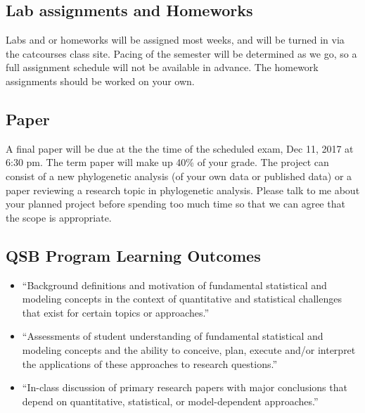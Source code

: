 \documentclass{article}
\begin{document}
\subsection*{Lab assignments and Homeworks}
Labs and or homeworks will be assigned most weeks, and will be turned in via the catcourses class site.
Pacing of the semester will be determined as we go, 
so a full assignment schedule will not be available in advance.
The homework assignments should be worked on your own.

\subsection*{Paper}
A final paper will be due at the the time of the scheduled exam, Dec 11, 2017 at 6:30 pm.
The term paper will make up 40\% of your grade. The project can consist of a new
phylogenetic analysis (of your own data or published data) or a paper reviewing a research topic
in phylogenetic analysis. Please talk to me about your planned project before spending too much
time so that we can agree that the scope is appropriate.


\subsection*{QSB Program Learning Outcomes}
\begin{itemize}
 \item  ``Background definitions and motivation of fundamental statistical and modeling concepts in the context of quantitative and statistical challenges that exist for certain topics or approaches.''
 \item ``Assessments of student understanding of fundamental statistical and modeling concepts and the ability to conceive, plan, execute and/or interpret the applications of these approaches to research questions.''
 \item ``In-class discussion of primary research papers with major conclusions that depend on quantitative, statistical, or model-dependent approaches.''
\end{itemize}
\end{document}
